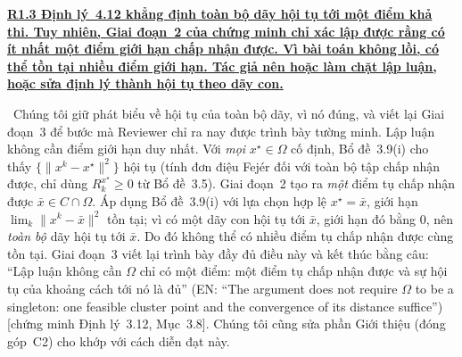 \documentclass[11pt]{article}
\newcommand{\response}[1]{\smallskip\noindent{\color{blue!60!black}\textbf{Trả lời.}}\ #1\par\medskip}
\newcommand{\loc}[1]{\textcolor{blue!50!black}{[#1]}}
\newcommand{\en}[1]{{\color{gray}\small(EN: ``#1'')}}
\newenvironment{point}[1]{\medskip\noindent\textbf{\uline{#1}}\par}{\par}
\begin{document}
\begin{point}{R1.3 Định lý~4.12 khẳng định toàn bộ dãy hội tụ tới một điểm khả
thi. Tuy nhiên, Giai đoạn~2 của chứng minh chỉ xác lập được rằng có ít nhất một điểm giới hạn
chấp nhận được. Vì bài toán không lồi, có thể tồn tại nhiều điểm giới hạn. Tác giả
nên hoặc làm chặt lập luận, hoặc sửa định lý thành hội tụ theo
dãy con.}
\response{Chúng tôi giữ phát biểu về hội tụ của toàn bộ dãy, vì nó đúng, và viết lại
Giai đoạn~3 để bước mà Reviewer chỉ ra nay được trình bày tường minh. Lập luận không
cần điểm giới hạn duy nhất. Với \emph{mọi} $x^\star\in\Omega$ cố định, Bổ đề~3.9(i)
cho thấy $\{\lVert x^k-x^\star\rVert^2\}$ hội tụ (tính đơn điệu Fej\'er đối với
toàn bộ tập chấp nhận được, chỉ dùng $R^{x^\star}_k\ge0$ từ Bổ đề~3.5). Giai đoạn~2
tạo ra \emph{một} điểm tụ chấp nhận được $\bar x\in C\cap\Omega$. Áp dụng Bổ đề~3.9(i)
với lựa chọn hợp lệ $x^\star=\bar x$, giới hạn $\lim_k\lVert x^k-\bar x\rVert^2$
tồn tại; vì có một dãy con hội tụ tới $\bar x$, giới hạn đó bằng $0$, nên \emph{toàn bộ}
dãy hội tụ tới $\bar x$. Do đó không thể có nhiều điểm tụ chấp nhận được cùng tồn tại.
Giai đoạn~3 viết lại trình bày đầy đủ điều này và kết thúc bằng câu: ``Lập luận không
cần $\Omega$ chỉ có một điểm: một điểm tụ chấp nhận được và sự hội tụ của khoảng cách tới nó
là đủ'' \en{The argument does not
require $\Omega$ to be a singleton: one feasible cluster point and the convergence of its
distance suffice} \loc{chứng minh Định lý~3.12,
Mục~3.8}. Chúng tôi cũng sửa phần Giới thiệu (đóng góp~C2) cho khớp với cách diễn đạt này.}
\end{point}
\end{document}
